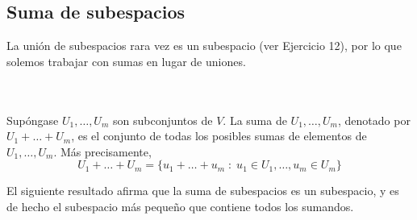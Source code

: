 \subsection{Suma de subespacios}

La unión de subespacios rara vez es un subespacio (ver Ejercicio 12), por lo que solemos trabajar con sumas en lugar de uniones.

\setcounter{mydef}{35}
\begin{mydef}\,\\\\
    Supóngase $U_1,\ldots ,U_m$ son subconjuntos de $V$. La suma de $U_1,\ldots, U_m$, denotado por $U_1 + \ldots+U_m$, es el conjunto de todas los posibles  sumas de elementos de $U_1,\ldots,U_m$. Más precisamente,
    $$U_1+\ldots+U_m = \lbrace u_1+\ldots +u_m\; :\; u_1\in U_1,\ldots, u_m \in U_m \rbrace$$
\end{mydef}
\vspace{.5cm}

El siguiente resultado afirma que la suma de subespacios es un subespacio, y es de hecho el subespacio más pequeño que contiene todos los sumandos.\\

